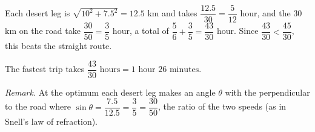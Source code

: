 Each desert leg is $\sqrt{10^2+7.5^2}=12.5$ km and takes $\dfrac{12.5}{30}=\dfrac{5}{12}$ hour, and the $30$ km on the road take $\dfrac{30}{50}=\dfrac{3}{5}$ hour, a total of $\dfrac{5}{6}+\dfrac{3}{5}=\dfrac{43}{30}$ hour. Since $\dfrac{43}{30}<\dfrac{45}{30}$, this beats the straight route.

The fastest trip takes $\boxed{\dfrac{43}{30}\text{ hours}=1\text{ hour }26\text{ minutes}}$.

\emph{Remark.} At the optimum each desert leg makes an angle $\theta$ with the perpendicular to the road where $\sin\theta=\dfrac{7.5}{12.5}=\dfrac{3}{5}=\dfrac{30}{50}$, the ratio of the two speeds (as in Snell's law of refraction).
